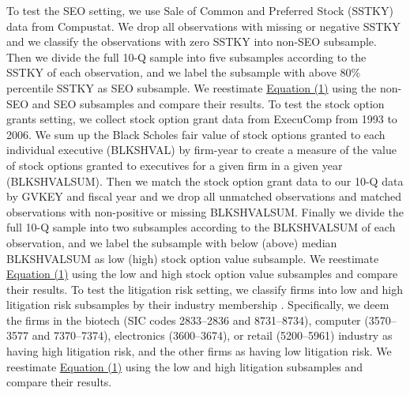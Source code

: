 \documentclass[letterpaper,12pt]{article}
\begin{document}
\begin{spacing}{1.5}
To test the SEO setting, we use Sale of Common and Preferred Stock (SSTKY) data from Compustat. We drop all observations with missing or negative SSTKY and we classify the observations with zero SSTKY into non-SEO subsample. Then we divide the full 10-Q sample into five subsamples according to the SSTKY of each observation, and we label the subsample with above 80\% percentile SSTKY as SEO subsample. We reestimate \hyperref[eq1]{Equation (1)} using the non-SEO and SEO subsamples and compare their results. To test the stock option grants setting, we collect stock option grant data from ExecuComp from 1993 to 2006. We sum up the Black Scholes fair value of stock options granted to each individual executive (BLKSHVAL) by firm-year to create a measure of the value of stock options granted to executives for a given firm in a given year (BLKSHVALSUM). Then we match the stock option grant data to our 10-Q data by GVKEY and fiscal year and we drop all unmatched observations and matched observations with non-positive or missing BLKSHVALSUM. Finally we divide the full 10-Q sample into two subsamples according to the BLKSHVALSUM of each observation, and we label the subsample with below (above) median BLKSHVALSUM as low (high) stock option value subsample. We reestimate \hyperref[eq1]{Equation (1)} using the low and high stock option value subsamples and compare their results. To test the litigation risk setting, we classify firms into low and high litigation risk subsamples by their industry membership \cite{francisShareholderLitigationCorporate1994,kimMeasuringSecuritiesLitigation2012}. Specifically, we deem the firms in the biotech (SIC codes 2833–2836 and 8731–8734), computer (3570–3577 and 7370–7374), electronics (3600–3674), or retail (5200–5961) industry as having high litigation risk, and the other firms as having low litigation risk. We reestimate \hyperref[eq1]{Equation (1)} using the low and high litigation subsamples and compare their results.


\end{spacing}
\end{document}
